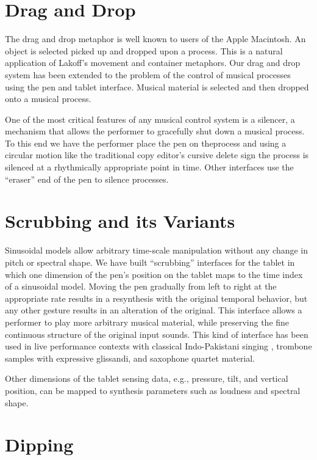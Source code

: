 \section{Drag and Drop}

The drag and drop metaphor is well known to users of the Apple Macintosh. An object is selected picked up and dropped upon a process. This is a natural application of Lakoff's movement and container metaphors. Our drag and drop system has been extended to the problem of the control of musical processes using the pen and tablet interface. Musical material is selected and then dropped onto a musical process.

One of the most critical features of any musical control system is a silencer, a mechanism that allows the performer to gracefully shut down a musical process. To this end we have the performer place the pen on theprocess and using a circular motion like the traditional copy editor's cursive delete sign the process is silenced at a rhythmically appropriate point in time. Other interfaces use the ``eraser'' end of the pen to silence processes.

\section{Scrubbing and its Variants}

Sinusoidal models allow arbitrary time-scale manipulation without any change in pitch or spectral shape. We have built ``scrubbing'' interfaces for the tablet in which one dimension of the pen's position on the tablet maps to the time index of a sinusoidal model. Moving the pen gradually from left to right at the appropriate rate results in a resynthesis with the original temporal behavior, but any other gesture results in an alteration of the original. This interface allows a performer to play more arbitrary musical material, while preserving the fine continuous structure of the original input sounds. This kind of interface has been used in live performance contexts with classical Indo-Pakistani singing \cite{Wessel:1998}, trombone samples with expressive glissandi, and saxophone quartet material.

Other dimensions of the tablet sensing data, e.g., pressure, tilt, and vertical position, can be mapped to synthesis parameters such as loudness and spectral shape.

\section{Dipping}

